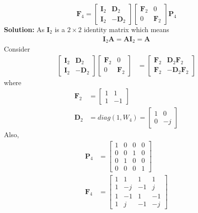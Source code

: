 \documentclass[journal,12pt,twocolumn]{IEEEtran}
\newcommand{\solution}{\noindent \textbf{Solution: }}
\let\vec\mathbf
\numberwithin{equation}{section}
\renewcommand\thesection{\arabic{section}}
\begin{document}
\begin{enumerate}[label=\arabic*.,ref=\thesection.\theenumi]
\begin{equation}
	\vec{F}_{4}=
\begin{bmatrix}
	\vec{I}_{2} & \vec{D}_{2} \\
\vec{I}_{2} & -\vec{D}_{2}
\end{bmatrix}
\begin{bmatrix}
\vec{F}_{2} & 0 \\
0 & \vec{F}_{2}
\end{bmatrix}
\vec{P}_{4}
\label{eq:f4qn}
\end{equation}
\solution As 
$\vec{I}_2$ is a $2\times 2$ identity matrix which means 
\begin{align}
\vec{I}_2 \vec{A}=\vec{A}\vec{I}_2=\vec{A}
\end{align}
Consider
\begin{align}
\begin{bmatrix}
	\vec{I}_{2} & \vec{D}_{2} \\
\vec{I}_{2} & -\vec{D}_{2}
\end{bmatrix}
\begin{bmatrix}
\vec{F}_{2} & 0 \\
0 & \vec{F}_{2}
\end{bmatrix}
&=\begin{bmatrix}
\vec{F}_{2} & \vec{D}_{2}\vec{F}_{2} \\
\vec{F}_{2} & -\vec{D}_{2}\vec{F}_{2}
\end{bmatrix}
\end{align}
where
\begin{align}
\vec{F}_{2}&=\begin{bmatrix}
1&1\\1&-1
\end{bmatrix}\\
\vec{D}_{2}&=diag(1,W_4)
=\begin{bmatrix}
1&0\\0&-j
\end{bmatrix}
\end{align}
Also,
\begin{align}
\label{eq:p4}
\vec{P}_{4}&=
\begin{bmatrix}
1&0&0&0\\0&0&1&0\\0&1&0&0\\0&0&0&1
\end{bmatrix}\\
\vec{F}_{4}&=
\begin{bmatrix}
1&1&1&1\\1&-j&-1&j\\1&-1&1&-1\\1&j&-1&-j

\end{bmatrix}
\end{align}
\end{enumerate}
\end{document}
